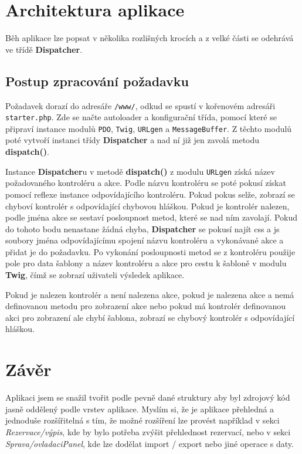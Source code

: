 \documentclass[12pt,a4paper]{article}
\let\oldsection\section
\renewcommand\section{\clearpage\oldsection}
\begin{document}
{\section{Architektura aplikace}}
Běh aplikace lze popsat v několika rozlišných krocích a z velké části se odehrává ve třídě \textbf{Dispatcher}.

{\subsection{Postup zpracování požadavku}}
Požadavek dorazí do adresáře \texttt{/www/}, odkud se spustí v kořenovém adresáři \texttt{starter.php}. Zde se načte autoloader a konfigurační třída, pomocí které se připraví instance modulů \texttt{PDO}, \texttt{Twig}, \texttt{URLgen} a \texttt{MessageBuffer}. Z těchto modulů poté vytvoří instanci třídy \textbf{Dispatcher} a nad ní již jen zavolá metodu \textbf{dispatch()}.

Instance \textbf{Dispatcher}u v metodě \textbf{dispatch()} z modulu \texttt{URLgen} získá název požadovaného kontroléru a akce. Podle názvu kontroléru se poté pokusí získat pomocí reflexe instance odpovídajícího kontroléru. Pokud pokus selže, zobrazí se chyboví kontrolér s odpovídající chybovou hláškou. Pokud je kontrolér nalezen, podle jména akce se sestaví posloupnost metod, které se nad ním zavolají. Pokud do tohoto bodu nenastane žádná chyba, \textbf{Dispatcher} se pokusí najít css a js soubory jména odpovídajícímu spojení názvu kontroléru a vykonávané akce a přidat je do požadavku. Po vykonání posloupnosti metod se z kontroléru použije pole pro data šablony a název kontroléru a akce pro cestu k šabloně v modulu \textbf{Twig}, čímž se zobrazí uživateli výsledek aplikace.

Pokud je nalezen kontrolér a není nalezena akce, pokud je nalezena akce a nemá definovanou metodu pro zobrazení akce nebo pokud má kontrolér definovanou akci pro zobrazení ale chybí šablona, zobrazí se chybový kontrolér s odpovídající hláškou.


{\section{Závěr}}
Aplikaci jsem se snažil tvořit podle pevně dané struktury aby byl zdrojový kód jasně oddělený podle vrstev aplikace. Myslím si, že je aplikace přehledná a jednoduše rozšířitelná s tím, že možné rozšíření lze provést například v sekci \textit{Rezervace/výpis}, kde by bylo potřeba zvýšit přehlednost rezervací, nebo v sekci \textit{Sprava/ovladaciPanel}, kde lze dodělat import / export nebo jiné operace s daty.


\end{document}
